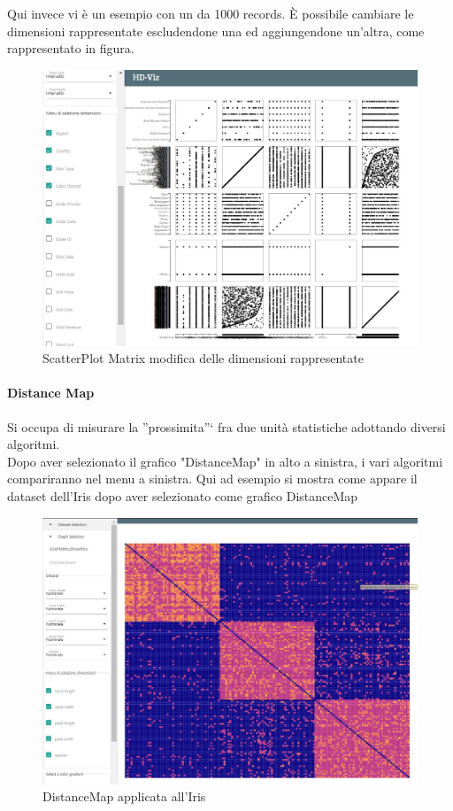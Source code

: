 \documentclass[../manuale_utente.tex]{subfiles}
\begin{document}
Qui invece vi è un esempio con un  da 1000 records. È possibile cambiare le dimensioni rappresentate escludendone una ed aggiungendone un'altra, come rappresentato in figura.

\begin{figure}[H]
	\centering
	\includegraphics[width=18cm]{img/spm/spm_cambio_dim.jpg}
	\caption{ScatterPlot Matrix modifica delle dimensioni rappresentate}
\end{figure}


\paragraph{Distance Map}
    \label{par:vis_distance}
Si occupa di misurare la ”prossimita”` fra due unità statistiche adottando diversi algoritmi.\\
Dopo aver selezionato il grafico "DistanceMap" in alto a sinistra, i vari algoritmi compariranno nel menu a sinistra. Qui ad esempio si mostra come appare il dataset dell'Iris
dopo aver selezionato come grafico DistanceMap

\begin{figure}[H]
	\centering
	\includegraphics[width=18cm]{img/dm/iris_base_dm.jpg}
	\caption{DistanceMap applicata all'Iris}
\end{figure}
\end{document}
